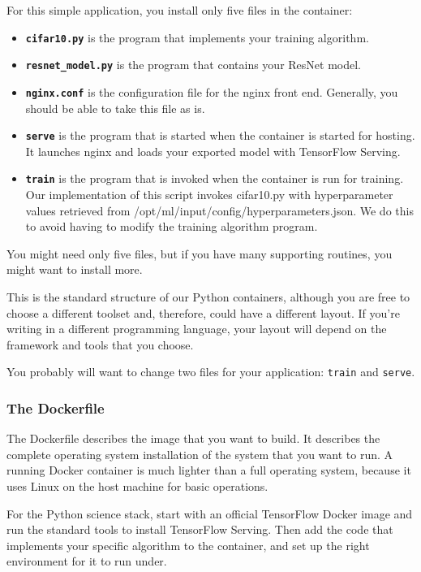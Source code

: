 \documentclass[11pt]{article}
\providecommand{\tightlist}{%
      \setlength{\itemsep}{0pt}\setlength{\parskip}{0pt}}
\begin{document}
For this simple application, you install only five files in the
container:

\begin{itemize}
\tightlist
\item
  \textbf{\texttt{cifar10.py}} is the program that implements your
  training algorithm.
\item
  \textbf{\texttt{resnet\_model.py}} is the program that contains your
  ResNet model.
\item
  \textbf{\texttt{nginx.conf}} is the configuration file for the nginx
  front end. Generally, you should be able to take this file as is.
\item
  \textbf{\texttt{serve}} is the program that is started when the
  container is started for hosting. It launches nginx and loads your
  exported model with TensorFlow Serving.
\item
  \textbf{\texttt{train}} is the program that is invoked when the
  container is run for training. Our implementation of this script
  invokes cifar10.py with hyperparameter values retrieved from
  /opt/ml/input/config/hyperparameters.json. We do this to avoid having
  to modify the training algorithm program.
\end{itemize}

You might need only five files, but if you have many supporting
routines, you might want to install more.

This is the standard structure of our Python containers, although you
are free to choose a different toolset and, therefore, could have a
different layout. If you're writing in a different programming language,
your layout will depend on the framework and tools that you choose.

You probably will want to change two files for your application:
\texttt{train} and \texttt{serve}.

    \subsubsection{The Dockerfile}\label{the-dockerfile}

The Dockerfile describes the image that you want to build. It describes
the complete operating system installation of the system that you want
to run. A running Docker container is much lighter than a full operating
system, because it uses Linux on the host machine for basic operations.

For the Python science stack, start with an official TensorFlow Docker
image and run the standard tools to install TensorFlow Serving. Then add
the code that implements your specific algorithm to the container, and
set up the right environment for it to run under.
\end{document}

